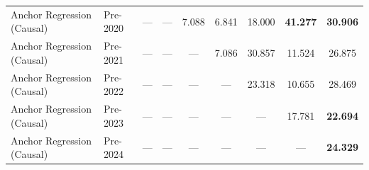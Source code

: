 \begin{table}[htbp]
{\begin{tabular}{l lccccccc}
Anchor Regression (Causal) & Pre-2020 & --- & --- & 7.088 & 6.841 & 18.000 & \textbf{41.277} & \textbf{30.906} \\
Anchor Regression (Causal) & Pre-2021 & --- & --- & --- & 7.086 & 30.857 & 11.524 & 26.875 \\
Anchor Regression (Causal) & Pre-2022 & --- & --- & --- & --- & 23.318 & 10.655 & 28.469 \\
Anchor Regression (Causal) & Pre-2023 & --- & --- & --- & --- & --- & 17.781 & \textbf{22.694} \\
Anchor Regression (Causal) & Pre-2024 & --- & --- & --- & --- & --- & --- & \textbf{24.329} \\
\bottomrule
\end{tabular}%
}
\end{table}
